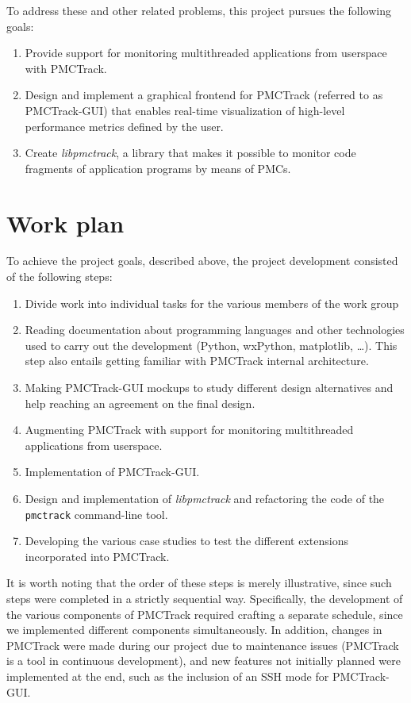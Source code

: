 To address these and other related problems, this project pursues the following goals:

\begin{enumerate}
\def\labelenumi{\arabic{enumi}.}
\item
  Provide support for monitoring multithreaded applications
  from userspace with PMCTrack.
\item
  Design and implement a graphical frontend for PMCTrack (referred to as
  PMCTrack-GUI) that enables real-time visualization of high-level performance metrics defined by the user.
\item
  Create \emph{libpmctrack}, a library that makes it possible to monitor code fragments of application programs by means of PMCs.
\end{enumerate}

\section{Work plan}\label{workplan}

To achieve the project goals, described above, the
project development consisted of the following steps:

\begin{enumerate}
\def\labelenumi{\arabic{enumi}.}
\itemsep1pt\parskip0pt
\item
  Divide work into individual tasks for the various members of the work group
\item
  Reading documentation about programming languages and other
  technologies used to carry out the development (Python, wxPython,
  matplotlib, \ldots). This step also entails getting familiar with PMCTrack internal architecture.
\item
  Making PMCTrack-GUI mockups to study different design alternatives and
  help reaching an agreement on the final design.
\item
  Augmenting PMCTrack with support for monitoring multithreaded applications from userspace.
\item
  Implementation of PMCTrack-GUI.
\item
  Design and implementation of \emph{libpmctrack} and refactoring the
  code of the \texttt{pmctrack} command-line tool.
\item
  Developing the various case studies to test the different extensions incorporated into PMCTrack.
\end{enumerate}

It is worth noting that the order of these steps is merely
illustrative, since such steps were completed in a strictly sequential
way. Specifically, the development of the various components of PMCTrack required crafting a separate schedule, since we implemented different components simultaneously. In addition, changes in PMCTrack were made during our project due to maintenance issues (PMCTrack is a
tool in continuous development), and new features not initially planned were implemented at the end, such as the inclusion of an SSH mode for PMCTrack-GUI. 
